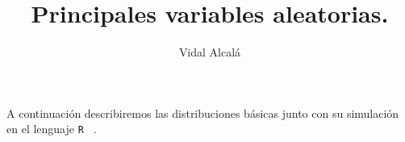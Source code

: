 \documentclass[12pt,reqno]{amsart}\usepackage[]{graphicx}\usepackage[]{color}
\title{Principales variables aleatorias.}
\author{Vidal Alcalá}
\begin{document}
\maketitle

A continuación describiremos las distribuciones básicas junto con su simulación en el lenguaje \verb+R + .

\end{document}
